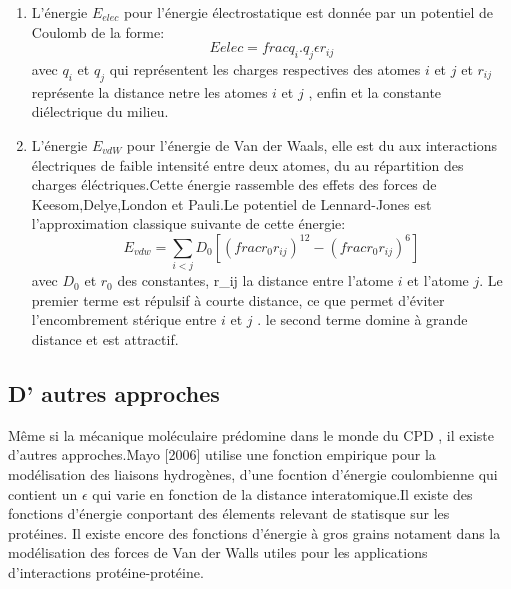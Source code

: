 \begin{enumerate}
  \label{VdW}
\item L'énergie $E_{elec}$ pour l'énergie électrostatique est donnée par un potentiel de Coulomb de la forme:
  \begin{equation}
    E{elec}= frac{q_i.q_j}{\epsilon r_{ij}}
  \end{equation}
  avec $q_i$ et $q_j$ qui représentent les charges respectives des atomes $i$ et $j$ et $r_{ij}$ représente la distance netre les atomes $i$ et $j$ , enfin \epsilon et la constante diélectrique du milieu.
\item L'énergie  $E_{vdW}$ pour l'énergie de Van der Waals, elle est du aux interactions électriques de faible intensité entre deux atomes, du au répartition des charges éléctriques.Cette énergie rassemble des effets des forces de Keesom,Delye,London et Pauli.Le potentiel de Lennard-Jones est l'approximation classique suivante de cette énergie:
  \begin{equation}
  E_{vdw} = \sum_{i<j}D_0 [(frac{r_0}{r_{ij}})^12 - (frac{r_0}{r_{ij}})^6]  
  \end{equation}
avec $D_0$ et $r_0$ des constantes, r_{ij} la distance entre l'atome $i$ et l'atome $j$. Le premier terme est répulsif à courte distance, ce que permet d'éviter l'encombrement stérique entre $i$ et $j$ . le second terme domine à grande distance et est attractif. 
  
\end{enumerate}


\subsection{D' autres approches}

Même si la mécanique moléculaire prédomine dans le monde du CPD , il existe d'autres approches.Mayo [2006] utilise une fonction empirique pour la modélisation des liaisons hydrogènes, d'une focntion d'énergie coulombienne qui contient un $\epsilon$ qui varie en fonction de la distance interatomique.Il existe des fonctions d'énergie  conportant des élements relevant de statisque sur les protéines. Il existe encore des fonctions d'énergie à gros grains notament dans la modélisation des forces de Van der Walls utiles pour les applications d'interactions protéine-protéine.


